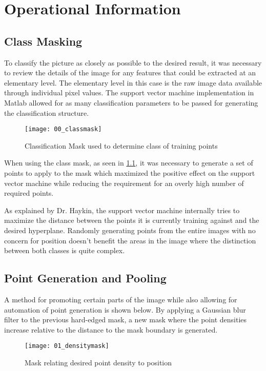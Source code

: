 \chapter{Operational Information}

\section{Class Masking}

To classify the picture as closely as possible to the desired result, it was necessary to review the details of the image for any features that could be extracted at an elementary level. The elementary level in this case is the raw image data available through individual pixel values. The support vector machine implementation in Matlab allowed for as many classification parameters to be passed for generating the classification structure. 

\begin{figure}[ht]
    \centering
    \texttt{[image: 00\_classmask]}
    \caption{Classification Mask used to determine class of training points}
    \label{fig:00_classmask}
\end{figure}

When using the class mask, as seen in \ref{fig:00_classmask}, it was necessary to generate a set of points to apply to the mask which maximized the positive effect on the support vector machine while reducing the requirement for an overly high number of required points. 

As explained by Dr. Haykin, the support vector machine internally tries to maximize the distance between the points it is currently training against and the desired hyperplane\citep{SH_hyperplane0}. Randomly generating points from the entire images with no concern for position doesn't benefit the areas in the image where the distinction between both classes is quite complex. 

\section{Point Generation and Pooling}

A method for promoting certain parts of the image while also allowing for automation of point generation is shown below. By applying a Gaussian blur filter to the previous hard-edged mask, a new mask where the point densities increase relative to the distance to the mask boundary is generated.

\begin{figure}[p]
    \centering
    \texttt{[image: 01\_densitymask]}
    \caption{Mask relating desired point density to position}
    \label{fig:01_densitymask}
\end{figure}

